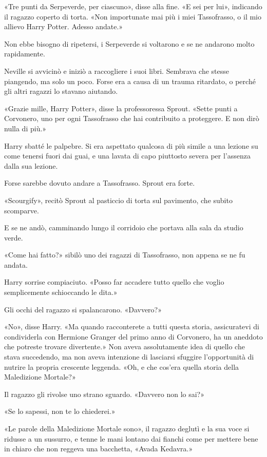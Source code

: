 «Tre punti da Serpeverde, per ciascuno», disse alla fine. «E sei per lui», indicando il ragazzo coperto di torta. «Non importunate mai più i miei Tassofrasso, o il mio allievo Harry Potter. Adesso andate.»

Non ebbe bisogno di ripetersi, i Serpeverde si voltarono e se ne andarono molto rapidamente.

Neville si avvicinò e iniziò a raccogliere i suoi libri. Sembrava che stesse piangendo, ma solo un poco. Forse era a causa di un trauma ritardato, o perché gli altri ragazzi lo stavano aiutando.

«Grazie mille, Harry Potter», disse la professoressa Sprout. «Sette punti a Corvonero, uno per ogni Tassofrasso che hai contribuito a proteggere. E non dirò nulla di più.»

Harry sbatté le palpebre. Si era aspettato qualcosa di più simile a una lezione su come tenersi fuori dai guai, e una lavata di capo piuttosto severa per l’assenza dalla sua lezione.

Forse sarebbe dovuto andare a Tassofrasso. Sprout era forte.

«Scourgify», recitò Sprout al pasticcio di torta sul pavimento, che subito scomparve.

E se ne andò, camminando lungo il corridoio che portava alla sala da studio verde.

«Come hai fatto?» sibilò uno dei ragazzi di Tassofrasso, non appena se ne fu andata.

Harry sorrise compiaciuto. «Posso far accadere tutto quello che voglio semplicemente schioccando le dita.»

Gli occhi del ragazzo si spalancarono. «Davvero?»

«No», disse Harry. «Ma quando racconterete a tutti questa storia, assicuratevi di condividerla con Hermione Granger del primo anno di Corvonero, ha un aneddoto che potreste trovare divertente.» Non aveva assolutamente idea di quello che stava succedendo, ma non aveva intenzione di lasciarsi sfuggire l’opportunità di nutrire la propria crescente leggenda. «Oh, e che cos’era quella storia della Maledizione Mortale?»

Il ragazzo gli rivolse uno strano sguardo. «Davvero non lo sai?»

«Se lo sapessi, non te lo chiederei.»

«Le parole della Maledizione Mortale sono», il ragazzo deglutì e la sua voce si ridusse a un sussurro, e tenne le mani lontano dai fianchi come per mettere bene in chiaro che non reggeva una bacchetta, «Avada Kedavra.»

